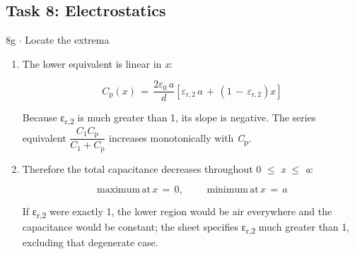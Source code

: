 \documentclass[11pt]{article}
\begin{document}
\begin{keepsection}\subsection{Task 8: Electrostatics}

\begin{workedbox}{8g \ensuremath{\cdot} Locate the extrema}
\begin{enumerate}
\item {}
The lower equivalent is linear in \textit{x}:

\begin{equation*}{C}_{\mathrm{p}}({x})\, =\, \dfrac{2ε_{0}\, {a}}{{d}}[ε_{\mathrm{r},2}\, {a}\, +\, (1\, -\, ε_{\mathrm{r},2}){x}]\end{equation*}

Because ε\textsubscript{r,2} is much greater than 1, its slope is negative. The series equivalent {\small\ensuremath{\dfrac{{C}_{1}{C}_{\mathrm{p}}}{{C}_{1}+{C}_{\mathrm{p}}}}} increases monotonically with \textit{C}\textsubscript{p}.
\item {}
Therefore the total capacitance decreases throughout 0 \ensuremath{\leq} \textit{x} \ensuremath{\leq} \textit{a}:

\begin{equation*}\text{maximum}\, \text{at}\, {x}\, =\, 0,\quad \, \quad \, \text{minimum}\, \text{at}\, {x}\, =\, {a}\end{equation*}

If ε\textsubscript{r,2} were exactly 1, the lower region would be air everywhere and the capacitance would be constant; the sheet specifies ε\textsubscript{r,2} much greater than 1, excluding that degenerate case.


\end{enumerate}
\end{workedbox}
\end{keepsection}
\end{document}
